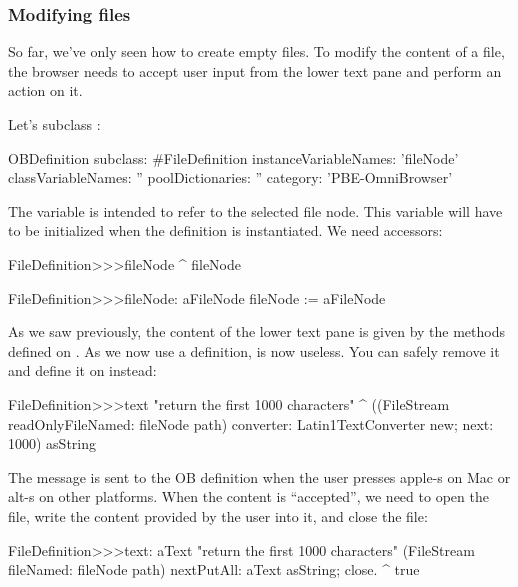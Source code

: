\documentclass[a4paper,10pt,twoside]{book}
\begin{document}
\subsubsection{Modifying files}

So far, we've only seen how to create empty files. To modify the content of a file, the browser needs to accept user input from the lower text pane and perform an action on it. 

Let's subclass :

\begin{code}{}    
OBDefinition subclass: #FileDefinition
	instanceVariableNames: 'fileNode'
	classVariableNames: ''
	poolDictionaries: ''
	category: 'PBE-OmniBrowser'
\end{code}

The variable  is intended to refer to the selected file node. This variable will have to be initialized when the definition is instantiated. We need accessors:

\begin{code}{}    
FileDefinition>>>fileNode
	^ fileNode

FileDefinition>>>fileNode: aFileNode
	fileNode := aFileNode
\end{code}

As we saw previously, the content of the lower text pane is given by the  methods defined on . As we now use a definition,  is now useless. You can safely remove it and define it on  instead:

\begin{code}{}
FileDefinition>>>text
	"return the first 1000 characters"
     ^ ((FileStream readOnlyFileNamed: fileNode path) converter: Latin1TextConverter new; 
              next: 1000) asString
\end{code}

The message  is sent to the OB definition when the user presses apple-s  on Mac or alt-s on other platforms. When the content is ``accepted'', we need to open the file, write the content provided by the user into it, and close the file:

\begin{code}{}
FileDefinition>>>text: aText
	"return the first 1000 characters"
     (FileStream fileNamed: fileNode path) 
				nextPutAll: aText asString;
				close.
	^ true
\end{code}
\end{document}

